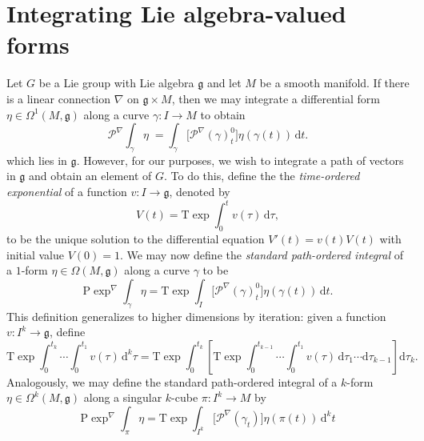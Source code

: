 \section{Integrating Lie algebra-valued forms}

Let $G$ be a Lie group with Lie algebra $\mathfrak{g}$ and let $M$ be a smooth manifold. If there is a linear connection $\nabla$ on $\mathfrak{g} \times M$, then we may integrate a differential form $\eta \in \Omega^1(M, \mathfrak{g})$ along a curve $\gamma \colon I \to M$ to obtain
\begin{equation}
  \mathcal{P}^\nabla \! \! \int_\gamma \eta \; =  \int_{\gamma} \Big[\mathcal{P}^\nabla(\gamma)_{t}^{0}\Big] \eta(\gamma(t)) \, \mathrm{d}t.
\end{equation}
which lies in $\mathfrak{g}$. However, for our purposes, we wish to integrate a path of vectors in $\mathfrak{g}$ and obtain an element of $G$. To do this, define the  the \emph{time-ordered exponential} of a function $v \colon I \to \mathfrak{g}$, denoted by
\begin{equation}
  V(t) = \mathrm{T}\exp \int_{0}^{t} v(\tau) \, \mathrm{d} \tau,
\end{equation}
to be the unique solution to the differential equation $V'(t) = v(t)V(t)$ with initial value $V(0) = 1$. We may now define the \emph{standard path-ordered integral} of a $1$-form $\eta \in \Omega(M, \mathfrak{g})$ along a curve $\gamma$ to be
\begin{equation}
  \mathrm{P}\exp^\nabla \!\int_\gamma \eta = \mathrm{T}\exp \int_I [\mathcal{P}^\nabla(\gamma)_{t}^{0}\Big] \eta(\gamma(t)) \, \mathrm{d}t.
\end{equation}
This definition generalizes to higher dimensions by iteration: given a function $v \colon I^k \to \mathfrak{g}$, define
\begin{equation}
  \mathrm{T}\exp \int_{0}^{t_k} \! \cdots \int_{0}^{t_1} v(\tau) \, \mathrm{d}^k\tau = \mathrm{T}\exp \int_0^{t_k} \left[\mathrm{T}\exp \int_{0}^{t_{k-1}} \!\!\! \cdots \int_{0}^{t_1} v(\tau) \, \mathrm{d}\tau_1 \cdots \mathrm{d}\tau_{k-1} \right] \mathrm{d}\tau_{k}.
\end{equation}
Analogously, we may define the standard path-ordered integral of a $k$-form $\eta \in \Omega^k(M, \mathfrak{g})$ along a singular $k$-cube $\pi \colon I^k \to M$ by
\begin{equation}
  \mathrm{P}\exp^\nabla \! \int_\pi \eta = \mathrm{T}\exp \int_{I^k} \Big[\mathcal{P}^\nabla(\gamma_t)\Big]\eta(\pi(t)) \, \mathrm{d}^k t
\end{equation}
